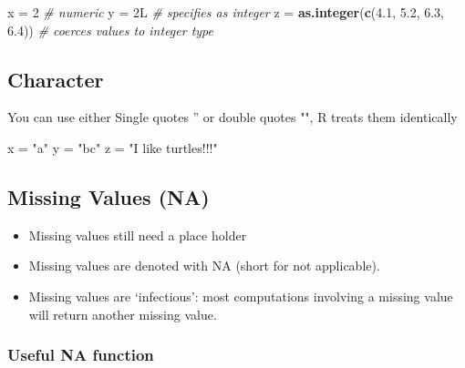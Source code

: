 \documentclass[
]{article}
\newenvironment{Shaded}{\begin{snugshade}}{\end{snugshade}}
\newcommand{\CommentTok}[1]{\textcolor[rgb]{0.56,0.35,0.01}{\textit{#1}}}
\newcommand{\DecValTok}[1]{\textcolor[rgb]{0.00,0.00,0.81}{#1}}
\newcommand{\FloatTok}[1]{\textcolor[rgb]{0.00,0.00,0.81}{#1}}
\newcommand{\KeywordTok}[1]{\textcolor[rgb]{0.13,0.29,0.53}{\textbf{#1}}}
\newcommand{\NormalTok}[1]{#1}
\newcommand{\StringTok}[1]{\textcolor[rgb]{0.31,0.60,0.02}{#1}}
\providecommand{\tightlist}{%
  \setlength{\itemsep}{0pt}\setlength{\parskip}{0pt}}
\begin{document}
\begin{Shaded}
\begin{Highlighting}[]
\NormalTok{x =}\StringTok{ }\DecValTok{2} \CommentTok{# numeric}
\NormalTok{y =}\StringTok{ }\NormalTok{2L }\CommentTok{# specifies as integer }
\NormalTok{z =}\StringTok{ }\KeywordTok{as.integer}\NormalTok{(}\KeywordTok{c}\NormalTok{(}\FloatTok{4.1}\NormalTok{, }\FloatTok{5.2}\NormalTok{, }\FloatTok{6.3}\NormalTok{, }\FloatTok{6.4}\NormalTok{)) }\CommentTok{# coerces values to integer type}
\end{Highlighting}
\end{Shaded}

\hypertarget{character}{%
\subsection{Character}\label{character}}

You can use either Single quotes '' or double quotes "", R treats them
identically

\begin{Shaded}
\begin{Highlighting}[]
\NormalTok{x =}\StringTok{ "a"}  
\NormalTok{y =}\StringTok{ "bc"}  
\NormalTok{z =}\StringTok{ "I like turtles!!!"}
\end{Highlighting}
\end{Shaded}

\hypertarget{missing-values-na}{%
\subsection{\texorpdfstring{\textbf{Missing Values
(NA)}}{Missing Values (NA)}}\label{missing-values-na}}

\begin{itemize}
\tightlist
\item
  Missing values still need a place holder
\item
  Missing values are denoted with NA (short for not applicable).
\item
  Missing values are `infectious': most computations involving a missing
  value will return another missing value.
\end{itemize}

\hypertarget{useful-na-function}{%
\subsubsection{\texorpdfstring{\textbf{Useful NA
function}}{Useful NA function}}\label{useful-na-function}}
\end{document}
